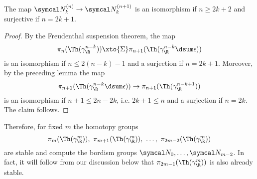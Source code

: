 \begin{corollary}
	The map $\Bord_k^{(n)} \to \Bord_k^{(n + 1)}$ is an isomorphism if $n \geq 2k + 2$ and surjective if $n = 2k + 1$.
\end{corollary}
\begin{proof}
	By the Freudenthal suspension theorem, the map
	\begin{equation*}
		\pi_n(\Th(\gamma_\R^{n - k})) \xto{\Sigma} \pi_{n + 1}(\Th(\gamma_\R^{n - k} \dsum \epsilon))
	\end{equation*}
	is an isomorphism if $n \leq 2(n - k) - 1$ and a surjection if $n = 2k + 1$.
	Moreover, by the preceding lemma the map
	\begin{equation*}
		\pi_{n + 1}(\Th(\gamma_\R^{n - k} \dsum \epsilon)) \to \pi_{n + 1}(\Th(\gamma_\R^{n - k + 1}))
	\end{equation*}
	is an isomorphism if $n + 1 \leq 2n - 2k$, i.e. $2k + 1 \leq n$ and a surjection if $n = 2k$.
	The claim follows.
\end{proof}
Therefore, for fixed $m$ the homotopy groups 
\begin{equation*}
	\pi_m(\Th(\gamma_\R^m)),\ \pi_{m + 1}(\Th(\gamma_\R^m)),\ \ldots,\ \pi_{2m - 2}(\Th(\gamma_\R^m))
\end{equation*}
are stable and compute the bordism groups $\Bord_0, \ldots, \Bord_{m - 2}$.
In fact, it will follow from our discussion below that $\pi_{2m - 1}(\Th(\gamma_\R^m))$ is also already stable.


